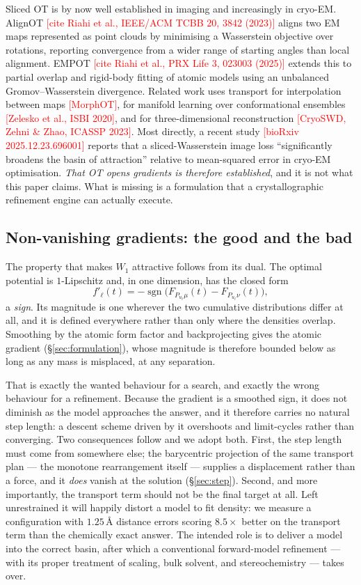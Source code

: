 \documentclass[11pt,a4paper]{article}
\newcommand{\sgn}{\operatorname{sgn}}
\newcommand{\TODO}[1]{\textcolor{red}{[#1]}}
\begin{document}
Sliced OT is by now well established in imaging and increasingly in cryo-EM. AlignOT
\TODO{cite Riahi et al., IEEE/ACM TCBB 20, 3842 (2023)} aligns two EM maps represented as
point clouds by minimising a Wasserstein objective over rotations, reporting convergence
from a wider range of starting angles than local alignment. EMPOT \TODO{cite Riahi et al.,
PRX Life 3, 023003 (2025)} extends this to partial overlap and rigid-body fitting of atomic
models using an unbalanced Gromov--Wasserstein divergence. Related work uses transport for
interpolation between maps \TODO{MorphOT}, for manifold learning over conformational
ensembles \TODO{Zelesko et al., ISBI 2020}, and for three-dimensional reconstruction
\TODO{CryoSWD, Zehni \& Zhao, ICASSP 2023}. Most directly, a recent study
\TODO{bioRxiv 2025.12.23.696001} reports that a sliced-Wasserstein image loss
``significantly broadens the basin of attraction'' relative to mean-squared error in
cryo-EM optimisation. \emph{That OT opens gradients is therefore established}, and it is
not what this paper claims. What is missing is a formulation that a crystallographic
refinement engine can actually execute.

\subsection{Non-vanishing gradients: the good and the bad}

The property that makes $W_1$ attractive follows from its dual. The optimal potential is
$1$-Lipschitz and, in one dimension, has the closed form
\begin{equation}
f'_\ell(t) = -\sgn\bigl(F_{P_{u_\ell}\mu}(t)-F_{P_{u_\ell}\nu}(t)\bigr),
\label{eq:pot}
\end{equation}
a \emph{sign}. Its magnitude is one wherever the two cumulative distributions differ at all,
and it is defined everywhere rather than only where the densities overlap. Smoothing by the
atomic form factor and backprojecting gives the atomic gradient
(\S\ref{sec:formulation}), whose magnitude is therefore bounded below as long as any mass
is misplaced, at any separation.

That is exactly the wanted behaviour for a search, and exactly the wrong behaviour for a
refinement. Because the gradient is a smoothed sign, it does not diminish as the model
approaches the answer, and it therefore carries no natural step length: a descent scheme
driven by it overshoots and limit-cycles rather than converging. Two consequences follow
and we adopt both. First, the step length must come from somewhere else; the barycentric
projection of the same transport plan --- the monotone rearrangement itself --- supplies a
displacement rather than a force, and it \emph{does} vanish at the solution
(\S\ref{sec:step}). Second, and more importantly, the transport term should not be the
final target at all. Left unrestrained it will happily distort a model to fit density: we
measure a configuration with $1.25$\,\AA{} distance errors scoring $8.5\times$ better on
the transport term than the chemically exact answer. The intended role is to deliver a
model into the correct basin, after which a conventional forward-model refinement --- with
its proper treatment of scaling, bulk solvent, and stereochemistry --- takes over.
\end{document}
